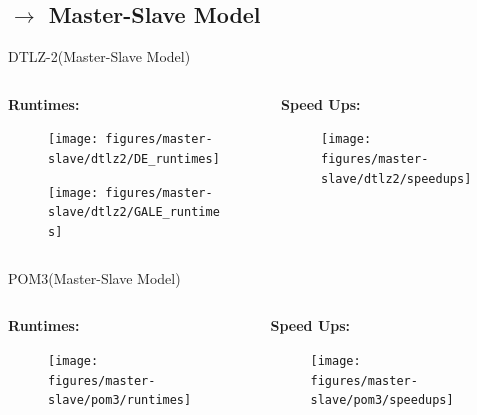 \documentclass[10pt]{beamer}
\begin{document}
\subsection{$\rightarrow$ Master-Slave Model}
\begin{frame}{DTLZ-2(Master-Slave Model)}
    \begin{columns}[t]
        \begin{column}{0.5\linewidth}
        \textbf{Runtimes:}
        \begin{figure}
            \centering
            \texttt{[image: figures/master-slave/dtlz2/DE\_runtimes]}
            \label{fig:DTLZ2_MS_DE_runtimes}
        \end{figure}
        \begin{figure}
            \centering
            \texttt{[image: figures/master-slave/dtlz2/GALE\_runtimes]}
            \label{fig:DTLZ2_MS_GALE_runtimes}
        \end{figure}
        \end{column}
        \begin{column}{0.5\linewidth}
        \textbf{Speed Ups:}
        \begin{figure}
            \centering
            \texttt{[image: figures/master-slave/dtlz2/speedups]}
            \label{fig:DTLZ2_MS_speedups}
        \end{figure}
        \end{column}
    \end{columns}
\end{frame}
\begin{frame}{POM3(Master-Slave Model)}
    \begin{columns}[t]
        \begin{column}{0.5\linewidth}
        \textbf{Runtimes:}
        \begin{figure}
            \centering
            \texttt{[image: figures/master-slave/pom3/runtimes]}
            \label{fig:POM3_MS_runtimes}
        \end{figure}
        \end{column}
        \begin{column}{0.5\linewidth}
        \textbf{Speed Ups:}
        \begin{figure}
            \centering
            \texttt{[image: figures/master-slave/pom3/speedups]}
            \label{fig:POM3_MS_speedups}
        \end{figure}
        \end{column}
    \end{columns}
\end{frame}
\end{document}
